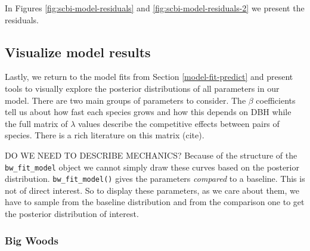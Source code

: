 \documentclass[12pt]{article}
\newenvironment{Shaded}{\begin{snugshade}}{\end{snugshade}}
\newcommand{\DataTypeTok}[1]{\textcolor[rgb]{0.13,0.29,0.53}{#1}}
\newcommand{\KeywordTok}[1]{\textcolor[rgb]{0.13,0.29,0.53}{\textbf{#1}}}
\newcommand{\NormalTok}[1]{#1}
\newcommand{\OperatorTok}[1]{\textcolor[rgb]{0.81,0.36,0.00}{\textbf{#1}}}
\newcommand{\StringTok}[1]{\textcolor[rgb]{0.31,0.60,0.02}{#1}}
\begin{document}
\begin{Shaded}
\end{Shaded}

\begin{Shaded}
\end{Shaded}

In Figures \ref{fig:scbi-model-residuals} and
\ref{fig:scbi-model-residuals-2} we present the residuals.

\hypertarget{viz-posterior-distributions}{%
\subsection{Visualize model results}\label{viz-posterior-distributions}}

Lastly, we return to the model fits from Section \ref{model-fit-predict}
and present tools to visually explore the posterior distributions of all
parameters in our model. There are two main groups of parameters to
consider. The \(\beta\) coefficients tell us about how fast each species
grows and how this depends on DBH while the full matrix of \(\lambda\)
values describe the competitive effects between pairs of species. There
is a rich literature on this matrix (cite).

DO WE NEED TO DESCRIBE MECHANICS? Because of the structure of the
\texttt{bw\_fit\_model} object we cannot simply draw these curves based
on the posterior distribution. \texttt{bw\_fit\_model()} gives the
parameters \emph{compared} to a baseline. This is not of direct
interest. So to display these parameters, as we care about them, we have
to sample from the baseline distribution and from the comparison one to
get the posterior distribution of interest.

\hypertarget{big-woods-1}{%
\subsubsection{Big Woods}\label{big-woods-1}}
\end{document}
